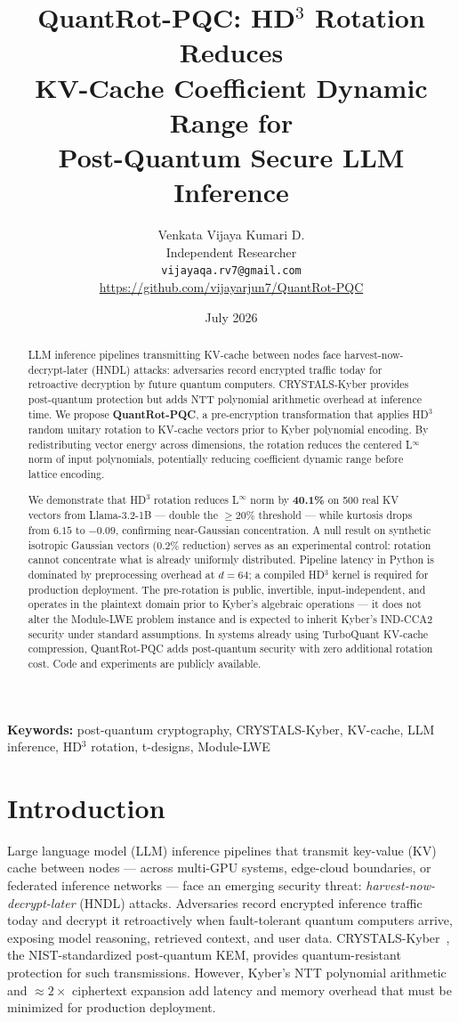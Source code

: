 \documentclass[preprint,a4paper]{article}
\title{
  \textbf{QuantRot-PQC: HD$^3$ Rotation Reduces\\
  KV-Cache Coefficient Dynamic Range for\\
  Post-Quantum Secure LLM Inference}
}
\author{
  Venkata Vijaya Kumari D.\\
  Independent Researcher\\
  \texttt{vijayaqa.rv7@gmail.com}\\
  \url{https://github.com/vijayarjun7/QuantRot-PQC}
}
\date{July 2026}
\begin{document}
\maketitle

\begin{abstract}
LLM inference pipelines transmitting KV-cache between
nodes face harvest-now-decrypt-later (HNDL) attacks:
adversaries record encrypted traffic today for
retroactive decryption by future quantum computers.
CRYSTALS-Kyber provides post-quantum protection but
adds NTT polynomial arithmetic overhead at inference
time. We propose \textbf{QuantRot-PQC}, a
pre-encryption transformation that applies HD$^3$
random unitary rotation to KV-cache vectors prior to
Kyber polynomial encoding. By redistributing vector
energy across dimensions, the rotation reduces the
centered L$^\infty$ norm of input polynomials,
potentially reducing coefficient dynamic range before
lattice encoding.

We demonstrate that HD$^3$ rotation reduces
L$^\infty$ norm by \textbf{40.1\%} on 500 real
KV vectors from Llama-3.2-1B --- double the
$\geq 20\%$ threshold --- while kurtosis drops
from $6.15$ to $-0.09$, confirming near-Gaussian
concentration. A null result on synthetic isotropic
Gaussian vectors ($0.2\%$ reduction) serves as an
experimental control: rotation cannot concentrate
what is already uniformly distributed.
Pipeline latency in Python is dominated by
preprocessing overhead at $d = 64$; a compiled
HD$^3$ kernel is required for production deployment.
The pre-rotation is public, invertible,
input-independent, and operates in the plaintext
domain prior to Kyber's algebraic operations ---
it does not alter the Module-LWE problem instance
and is expected to inherit Kyber's IND-CCA2 security
under standard assumptions. In systems already using
TurboQuant KV-cache compression, QuantRot-PQC adds
post-quantum security with zero additional rotation
cost. Code and experiments are publicly available.
\end{abstract}

\textbf{Keywords:} post-quantum cryptography,
CRYSTALS-Kyber, KV-cache, LLM inference,
HD$^3$ rotation, t-designs, Module-LWE



\section{Introduction}
\label{sec:intro}
Large language model (LLM) inference pipelines that
transmit key-value (KV) cache between nodes ---
across multi-GPU systems, edge-cloud boundaries, or
federated inference networks --- face an emerging
security threat: \emph{harvest-now-decrypt-later}
(HNDL) attacks. Adversaries record encrypted
inference traffic today and decrypt it retroactively
when fault-tolerant quantum computers arrive,
exposing model reasoning, retrieved context, and
user data. CRYSTALS-Kyber~\cite{kyber2021}, the
NIST-standardized post-quantum KEM, provides
quantum-resistant protection for such transmissions.
However, Kyber's NTT polynomial arithmetic and
$\approx 2\times$ ciphertext expansion add latency
and memory overhead that must be minimized for
production deployment.
\end{document}
